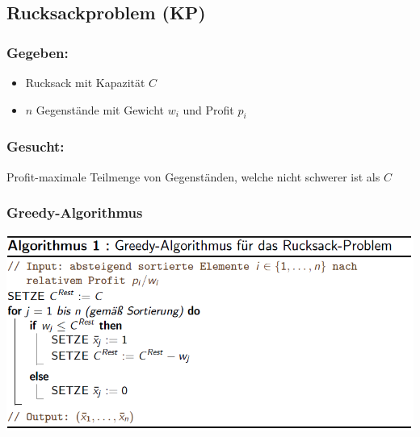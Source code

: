 \documentclass[12pt]{article}
\begin{document}
		\subsection{Rucksackproblem (KP)}
			\subsubsection*{Gegeben:}
			\begin{itemize}
				\item Rucksack mit Kapazität $C$
				\item $n$ Gegenstände mit Gewicht $w_i$ und Profit $p_i$
			\end{itemize}
			
			\subsubsection*{Gesucht:}
			Profit-maximale Teilmenge von Gegenständen, welche nicht schwerer ist als $C$
			
			\subsubsection{Greedy-Algorithmus}\label{KPGreedy}
			\includegraphics[scale=0.6]{KPGreedy}
\end{document}
